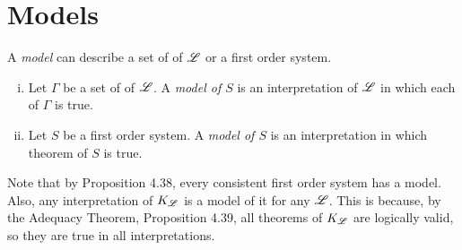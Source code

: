 
\section{Models}

\begin{definition}
  A \textit{model} can describe a set of \wfs{} of \(\mathscr{L}\) or a first order system.
  \begin{enumerate}[(i)]
    \item Let \(\Gamma\) be a set of \wfs{} of \(\mathscr{L}\). A \textit{model of \(S\)} is an interpretation of \(\mathscr{L}\) in which each \wf{} of \(\Gamma\) is true.

    \item Let \(S\) be a first order system. A \textit{model of \(S\)} is an interpretation in which theorem of \(S\) is true.
  \end{enumerate}
\end{definition}

Note that by Proposition 4.38, every consistent first order system has a model. Also, any interpretation of \(K_{\mathscr{L}}\) is a model of it for any \(\mathscr{L}\). This is because, by the Adequacy Theorem, Proposition 4.39, all theorems of \(K_{\mathscr{L}}\) are logically valid, so they are true in all interpretations.

